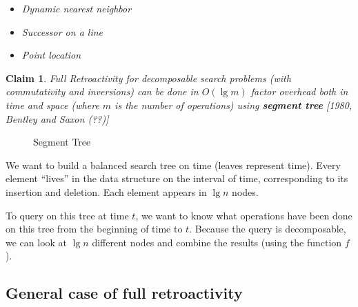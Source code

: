 \documentclass[11pt]{article}
\newtheorem{claim}[theorem]{Claim}
\begin{document}
\begin{itemize}
\item {\em Dynamic nearest neighbor}
\item {\em Successor on a line}
\item {\em Point location}
\end{itemize}

\begin{claim}
Full Retroactivity for decomposable search problems (with commutativity and inversions) can be done in $O(\lg{m})$ factor overhead both in time and space (where $m$ is the number of operations) using {\bf segment tree} [1980, Bentley and Saxon (??)]
\end{claim}

\begin{figure}[h]
  \centering
  \leavevmode
  \caption{Segment Tree}
\end{figure}

We want to build a balanced search tree on time (leaves represent time). Every element ``lives'' in the data structure on the interval of time, corresponding to its insertion and deletion. Each element appears in $\lg{n}$ nodes.

To query on this tree at time $t$, we want to know what operations have been done on this tree from the beginning of time to $t$. Because the query is decomposable, we can look at $\lg{n}$ different nodes and combine the results (using the function $f$). 

\subsection{General case of full retroactivity}
\end{document}
